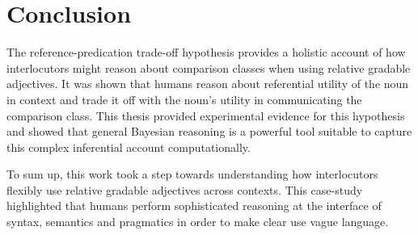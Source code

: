 

\section{Conclusion}

The reference-predication trade-off hypothesis provides a holistic account of how interlocutors might reason about comparison classes when using relative gradable adjectives. It was shown that humans reason about referential utility of the noun in context and trade it off with the noun's utility in communicating the comparison class. This thesis provided experimental evidence for this hypothesis and showed that general Bayesian reasoning is a powerful tool suitable to capture this complex inferential account computationally.  %

To sum up, this work took a step towards understanding how interlocutors flexibly use relative gradable adjectives across contexts. %
This case-study highlighted that humans perform sophisticated reasoning at the interface of syntax, semantics and pragmatics in order to make clear use vague language. %
